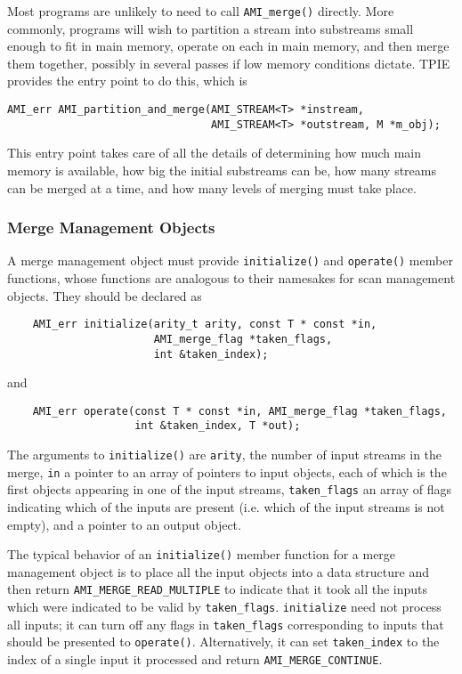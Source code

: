 Most programs are unlikely to need to call \verb|AMI_merge()|
directly. More commonly, programs will wish to
partition a stream into substreams small enough to fit in main memory,
operate on each in main memory, and then merge them together, possibly in
several passes if low memory conditions dictate. TPIE provides the entry
point to do this, which is
\begin{verbatim}
AMI_err AMI_partition_and_merge(AMI_STREAM<T> *instream,
                                AMI_STREAM<T> *outstream, M *m_obj);
\end{verbatim}
This entry point takes care of all the details of determining how much
main memory is available, how big the initial substreams can be, how
many streams can be merged at a time, and how many levels of merging
must take place.

\subsubsection{Merge Management Objects}  
 A merge management object
must provide \verb|initialize()| and \verb|operate()| member
functions, whose functions are analogous to their namesakes for scan
management objects.  They should be declared as
\begin{verbatim}
    AMI_err initialize(arity_t arity, const T * const *in,
                       AMI_merge_flag *taken_flags,
                       int &taken_index);
\end{verbatim}
and
\begin{verbatim}
    AMI_err operate(const T * const *in, AMI_merge_flag *taken_flags,
                    int &taken_index, T *out);
\end{verbatim}
The arguments to \verb|initialize()| are \verb|arity|, the number of
input streams in the merge, \verb|in| a pointer to an array of
pointers to input objects, each of which is the first objects appearing
in one of the input streams,  \verb|taken_flags| an array of flags
indicating which of the inputs are present (i.e. which of the input
streams is not empty), and a pointer to an output object.

The typical behavior of an \verb|initialize()| member function for a
merge management object is to place all the input objects into a data
structure and then return \verb|AMI_MERGE_READ_MULTIPLE| to indicate
that it took all the inputs which were indicated to be valid by
\verb|taken_flags|.  \verb|initialize| need not process all inputs; it
can turn off any flags in \verb|taken_flags| corresponding to inputs
that should be presented to \verb|operate()|.  Alternatively, it can
set \verb|taken_index| to the index of a single input it processed and
return \verb|AMI_MERGE_CONTINUE|.

